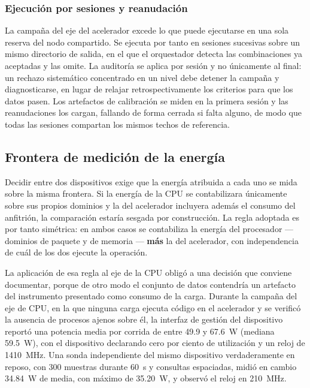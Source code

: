 \documentclass[12pt,oneside,spanish]{book}
\begin{document}
\subsubsection*{Ejecución por sesiones y reanudación}

La campaña del eje del acelerador excede lo que puede ejecutarse en una sola reserva del nodo compartido. Se ejecuta por tanto en sesiones sucesivas sobre un mismo directorio de salida, en el que el orquestador detecta las combinaciones ya aceptadas y las omite. La auditoría se aplica por sesión y no únicamente al final: un rechazo sistemático concentrado en un nivel debe detener la campaña y diagnosticarse, en lugar de relajar retrospectivamente los criterios para que los datos pasen. Los artefactos de calibración se miden en la primera sesión y las reanudaciones los cargan, fallando de forma cerrada si falta alguno, de modo que todas las sesiones compartan los mismos techos de referencia.

\subsection{Frontera de medición de la energía}
\label{sec:fase2-energia}

Decidir entre dos dispositivos exige que la energía atribuida a cada uno se mida sobre la misma frontera. Si la energía de la CPU se contabilizara únicamente sobre sus propios dominios y la del acelerador incluyera además el consumo del anfitrión, la comparación estaría sesgada por construcción. La regla adoptada es por tanto simétrica: en ambos casos se contabiliza la energía del procesador --- dominios de paquete y de memoria --- \textbf{más} la del acelerador, con independencia de cuál de los dos ejecute la operación.

La aplicación de esa regla al eje de la CPU obligó a una decisión que conviene documentar, porque de otro modo el conjunto de datos contendría un artefacto del instrumento presentado como consumo de la carga. Durante la campaña del eje de CPU, en la que ninguna carga ejecuta código en el acelerador y se verificó la ausencia de procesos ajenos sobre él, la interfaz de gestión del dispositivo reportó una potencia media por corrida de entre 49.9 y 67.6~W (mediana 59.5~W), con el dispositivo declarando cero por ciento de utilización y un reloj de 1410~MHz. Una sonda independiente del mismo dispositivo verdaderamente en reposo, con 300 muestras durante 60~s y consultas espaciadas, midió en cambio 34.84~W de media, con máximo de 35.20~W, y observó el reloj en 210~MHz.
\end{document}
